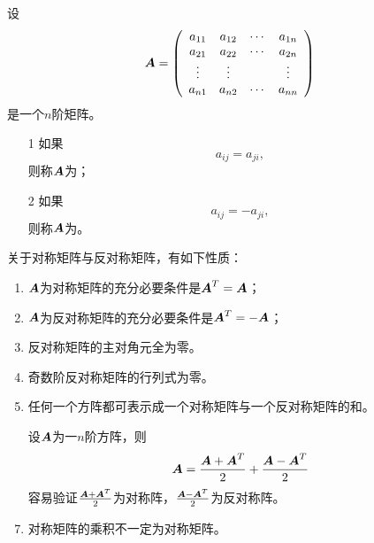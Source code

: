 \begin{frame}
\begin{dingyi}
  设
  $$
  \boldsymbol{A} = \left(
    \begin{array}{cccc}
      a_{11} & a_{12} & \cdots & a_{1n} \\
      a_{21} & a_{22} & \cdots & a_{2n} \\
      \vdots   & \vdots &  & \vdots \\
      a_{n1} & a_{n2} & \cdots & a_{nn} 
    \end{array}
  \right)
  $$
  是一个$n$阶矩阵。
  \begin{itemize}
  \item[1]
    如果
    $$
    a_{ij} = a_{ji},
    $$
    则称$\boldsymbol{A}$为；
  \item[2]
    如果
    $$
    a_{ij} = -a_{ji},
    $$
    则称$\boldsymbol{A}$为。
  \end{itemize}      
\end{dingyi}
\end{frame}

\begin{frame}
\begin{zhu}
  关于对称矩阵与反对称矩阵，有如下性质：
  \begin{enumerate}
  \item $\boldsymbol{A}$为对称矩阵的充分必要条件是$\boldsymbol{A}^T=\boldsymbol{A}$； \\[0.15in]
  \item $\boldsymbol{A}$为反对称矩阵的充分必要条件是$\boldsymbol{A}^T=-\boldsymbol{A}$；\\[0.15in]
  \item 反对称矩阵的主对角元全为零。 \\[0.15in]
  \item 奇数阶反对称矩阵的行列式为零。\\[0.15in]
  \item 任何一个方阵都可表示成一个对称矩阵与一个反对称矩阵的和。\\[0.15in]
  \item[]  设$\boldsymbol{A}$为一$n$阶方阵，则
    $$
    \boldsymbol{A} = \frac{\boldsymbol{A}+\boldsymbol{A}^T}2 + \frac{\boldsymbol{A}-\boldsymbol{A}^T}2
    $$
    容易验证$\frac{\boldsymbol{A}+\boldsymbol{A}^T}2$为对称阵，$\frac{\boldsymbol{A}-\boldsymbol{A}^T}2$为反对称阵。 \\[0.15in]
  \item 对称矩阵的乘积不一定为对称矩阵。
  \item[]  
  \end{enumerate}
\end{zhu}
\end{frame}

